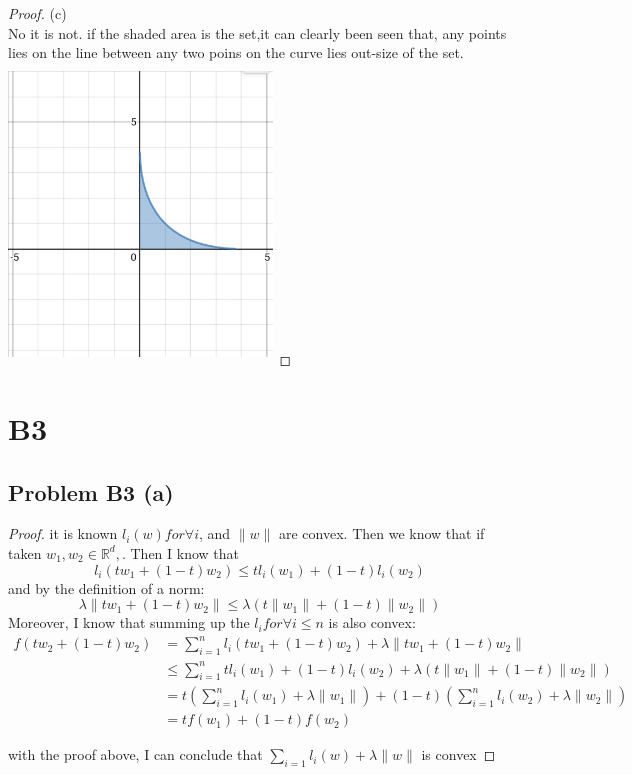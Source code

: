 \documentclass[12pt]{article}
\begin{document}
\begin{proof}
        (c)\\
        No it is not. if the shaded area is the set,it can clearly been seen that, any points lies on the line between any two poins on the curve lies out-size of the set.\\

        \includegraphics[width = 7cm, height = 8cm]{../code/b2_c.jpg}
\end{proof}
\newpage

\section*{B3}
\subsection*{Problem B3 (a)}
\begin{proof}
        it is known $l_i(w) for \forall i$, and $\|w\|$ are convex. Then we know that if taken $w_1, w_2 \in \mathbb{R}^d,$. Then I know that $$l_i(tw_1 + (1-t)w_2) \leq  tl_i(w_1) + (1-t)l_i(w_2)$$
        and by the definition of a norm: 
        $$\lambda \|tw_1 + (1-t) w_2\| \leq  \lambda(t\|w_1\|+ (1-t) \|w_2\|) $$
        Moreover, I know that summing up the $l_i for \forall i \leq n$ is also convex: \\
        \[
\begin{aligned}
        f(tw_2 + (1-t)w_2) &= \sum_{i=1}^n l_i(t w_1 + (1-t) w_2) + \lambda \|tw_1 + (1-t) w_2\|\\ 
                           & \leq  \sum_{i=1}^n tl_i(w_1) + (1-t)l_i(w_2) +   \lambda(t\|w_1\|+ (1-t) \|w_2\|) \\
                           & = t(\sum_{i=1}^n l_i(w_1)  + \lambda  \|w_1\|)+ (1-t) (\sum_{i =1} ^{n} l_i(w_2) + \lambda \|w_2\|)\\ 
                           & = t f(w_1) + (1-t) f(w_2)
\end{aligned}
\]

\noindent with the proof above, I can conclude that $\sum_{i=1} l_i(w) + \lambda \|w\|$ is convex
\end{proof} 
\end{document}
